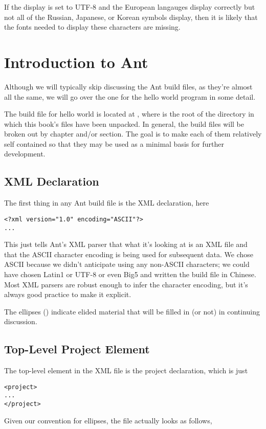 If the display is set to UTF-8 and the European langauges display correctly but
not all of the Russian, Japanese, or Korean symbols display, then it is likely
that the fonts needed to display these characters are missing.

\section{Introduction to Ant}

Although we will typically skip discussing the Ant build files,
as they're almost all the same, we will go over the one for the
hello world program in some detail.  

The build file for hello world is located at
, where \relpath{} is the root of the
directory in which this book's files have been unpacked.  In general, the
build files will be broken out by chapter and/or section.  The goal is
to make each of them relatively self contained so that they may be
used as a minimal basis for further development.

\subsection{XML Declaration}

The first thing in any Ant build file is the XML declaration, here
%
\begin{verbatim}
<?xml version="1.0" encoding="ASCII"?>
...
\end{verbatim}
%
This just tells Ant's XML parser that what it's looking at is an XML
file and that the ASCII character encoding is being used for
subsequent data.  We chose ASCII because we didn't anticipate using
any non-ASCII characters; we could have chosen Latin1 or UTF-8 or even
Big5 and written the build file in Chinese.  Most XML parsers are
robust enough to infer the character encoding, but it's always good
practice to make it explicit.

The ellipses () indicate elided material that will be
filled in (or not) in continuing discussion.  

\subsection{Top-Level Project Element} 

The top-level element in the XML file is the project declaration,
which is just
%
\begin{verbatim}
<project>
...
</project>
\end{verbatim}
%
Given our convention for ellipses, the file actually looks as follows,

